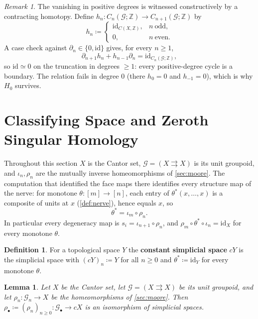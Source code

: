 \documentclass{extracta-temp-26}
\numberwithin{equation}{section}
\newtheorem{lem}[teo]{Lemma}
\theoremstyle{definition}
\newtheorem{defi}[teo]{Definition}
\theoremstyle{remark}
\newtheorem{rem}[teo]{Remark}
\newcommand{\G}{\mathcal{G}}
\newcommand{\Z}{\mathbb{Z}}
\newcommand{\id}{\mathrm{id}}
\newcommand{\term}[1]{\textbf{#1}}
\begin{document}
\begin{rem}\label{rem:homotopy}
The vanishing in positive degrees is witnessed constructively by a contracting homotopy.
Define \(h_n\colon C_n(\G;\Z)\to C_{n+1}(\G;\Z)\) by
\begin{equation}\label{eq:contraction}
h_n\coloneqq
\begin{cases}
\id_{C(X,\Z)},& n\ \text{odd},\\
0,& n\ \text{even}.
\end{cases}
\end{equation}
A case check against \(\partial_n\in\{0,\id\}\) gives, for every \(n\ge 1\),
\begin{equation}\label{eq:contraction-identity}
\partial_{n+1}h_n+h_{n-1}\partial_n=\id_{C_n(\G;\Z)},
\end{equation}
so \(\id\simeq 0\) on the truncation in degrees \(\ge 1\): every positive-degree cycle is a boundary.
The relation fails in degree \(0\) (there \(h_0=0\) and \(h_{-1}=0\)), which is why \(H_0\) survives.
\end{rem}

\section{Classifying Space and Zeroth Singular Homology}\label{sec:classifying}
Throughout this section \(X\) is the Cantor set, \(\G=(X\rightrightarrows X)\) is its unit groupoid, and \(\iota_n,\rho_n\) are the mutually inverse homeomorphisms of \cref{sec:moore}.
The computation that identified the face maps there identifies every structure map of the nerve: for monotone \(\theta\colon[m]\to[n]\), each entry of \(\theta^*(x,\dots,x)\) is a composite of units at \(x\) (\cref{def:nerve}), hence equals \(x\), so
\begin{equation}\label{eq:unit-structure}
\theta^*=\iota_m\circ\rho_n.
\end{equation}
In particular every degeneracy map is \(s_i=\iota_{n+1}\circ\rho_n\), and \(\rho_m\circ\theta^*\circ\iota_n=\id_X\) for every monotone \(\theta\).

\begin{defi}\label{def:const}
For a topological space \(Y\) the \term{constant simplicial space} \(cY\) is the simplicial space with \((cY)_n\coloneqq Y\) for all \(n\ge 0\) and \(\theta^*\coloneqq\id_Y\) for every monotone \(\theta\).
\end{defi}

\begin{lem}\label{lem:iso}
Let \(X\) be the Cantor set, let \(\G=(X\rightrightarrows X)\) be its unit groupoid, and let \(\rho_n\colon\G_n\to X\) be the homeomorphisms of \cref{sec:moore}.
Then \(\rho_\bullet\coloneqq(\rho_n)_{n\ge 0}\colon\G_\bullet\to cX\) is an isomorphism of simplicial spaces.
\end{lem}
\end{document}
